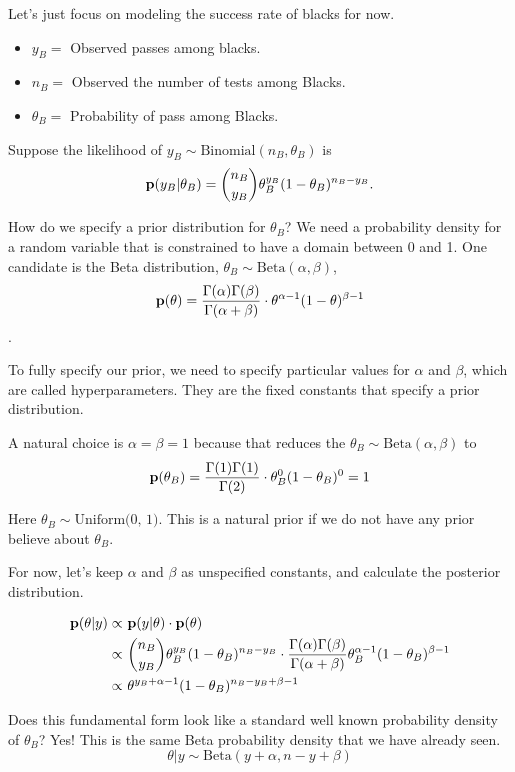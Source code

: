 Let's just focus on modeling the success rate of blacks for now.
\begin{itemize}
    \item $y_B=$ Observed passes among blacks.
    \item $n_B=$ Observed the number of  tests among Blacks.
    \item $\theta_B=$ Probability of pass among Blacks.
\end{itemize}

Suppose the likelihood of  $y_B \sim \text{Binomial}(n_B, \theta_B)$ is
\[
{\mathbf p}(y_B| \theta_B) = \binom{n_B}{y_B} \theta_B^{y_B} (1-\theta_B)^{n_B - y_B}.
\]

How do we specify a prior distribution for $\theta_B$? We need a probability density for a random variable that is constrained to have a domain between 0 and 1. One candidate is the Beta distribution, $\theta_B \sim \text{Beta}(\alpha, \beta)$,
\[
    {\mathbf p}(\theta) = \frac{\Gamma(\alpha) \Gamma(\beta)}{\Gamma(\alpha + \beta)} \cdot \theta^{\alpha-1} (1 - \theta)^{\beta-1}
\]. 

To fully specify our prior, we need to specify particular values for $\alpha$ and $\beta$, which are called hyperparameters. They are the fixed constants that specify a prior distribution.

A natural choice is $\alpha = \beta = 1$ because that reduces the $\theta_B \sim \text{Beta}(\alpha, \beta)$ to 
\[
{\mathbf p}(\theta_B) = \frac{\Gamma(1)\Gamma(1)}{\Gamma(2)} \cdot \theta_{B}^0 (1 - \theta_B)^0 = 1
\]

Here $\theta_B \sim \text{Uniform(0, 1)}$. This is  a natural prior if we do not have any prior believe about $\theta_B$.

For now, let's keep $\alpha$ and $\beta$ as unspecified constants, and calculate the posterior distribution.

\begin{align*}
    {\mathbf p}(\theta|y) 
    \propto& ~{\mathbf p}(y| \theta) \cdot {\mathbf p}(\theta)\\
    \propto& ~\binom{n_B}{y_B}\theta_B^{y_B} (1-\theta_B)^{n_B-y_B} \cdot \frac{\Gamma(\alpha)\Gamma(\beta)}{\Gamma(\alpha+\beta)}\theta_B^{\alpha-1} (1 - \theta_B)^{\beta-1}\\
    \propto& ~\theta^{y_B+\alpha-1} (1-\theta_B)^{n_B-y_B+\beta-1}
\end{align*}

Does this fundamental form look like a standard well known probability density of $\theta_B$? Yes! This is the same Beta probability density that we have already seen.
\[
    \theta| y \sim \text{Beta}(y+\alpha, n-y+\beta)
\]

